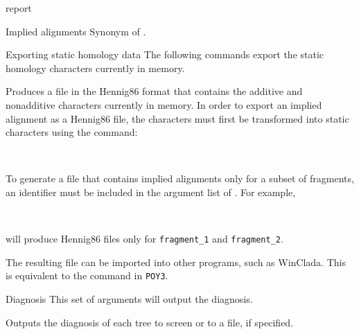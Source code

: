 \begin{command}{report}{}
\begin{arguments}
\begin{argumentgroup}{Implied alignments}
                {Synonym of .}
                {}

        \end{argumentgroup}

        \begin{argumentgroup}{Exporting static homology data}
            {The following commands export the static homology characters
            currently in memory.}

                {Produces a file in the Hennig86 format that contains the
                additive and nonadditive characters currently in memory.  In
                order to export an implied alignment as a Hennig86 file, the
                characters must first be transformed into static characters
                using the  command: 
                \begin{flushleft}
                     \\
                \end{flushleft} 
                To generate a file that contains implied
                alignments only for a subset of fragments, an identifier must be
                included in the argument list of . For
                example, 
                \begin{flushleft}
                 \\
                \end{flushleft}
                will produce Hennig86 files only for
                \texttt{fragment\_1} and \texttt {fragment\_2}.
                
                The resulting file can be imported into other programs,
                such as WinClada.  This is equivalent to the
                 command in \texttt{POY3}.}
                {}

		\end{argumentgroup}

		\begin{argumentgroup}{Diagnosis}
			{This set of arguments will output the diagnosis.} 

                {Outputs the diagnosis of each tree to screen or to a file, if
                specified.} 
                {}


\end{argumentgroup}
\end{arguments}
\end{command}
